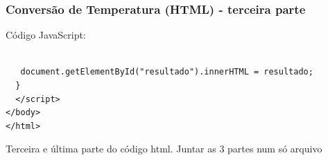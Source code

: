 \documentclass[13pt, xcolor={dvipsnames,svgnames}, portuguese]{beamer}
\begin{document}
\begin{frame}[fragile]
  \frametitle{Conversão de Temperatura (HTML) - terceira parte}
  Código JavaScript:
  \begin{verbatim}

   document.getElementById("resultado").innerHTML = resultado;
  }
  </script>
</body>
</html>
  \end{verbatim}
 Terceira e última parte do código html. Juntar as 3 partes num só arquivo
\end{frame}




\end{document}
